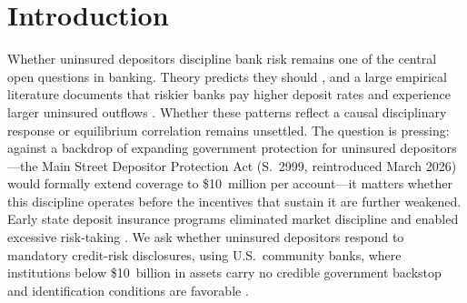 \section{Introduction}
\label{sec:intro}

Whether uninsured depositors discipline bank risk remains one of the
central open questions in banking.  Theory predicts they should
\citep{calomiris1991role, diamond2001liquidity}, and a large empirical
literature documents that riskier banks pay higher deposit rates and
experience larger uninsured outflows \citep{park1995market,
martinez2001depositors, maechler2006dynamic, iyer2016tale, egan2017deposit,
chen2024liquidity}.  Whether these patterns reflect a causal disciplinary
response or equilibrium correlation remains unsettled.  The question is
pressing: against a backdrop of expanding government protection for
uninsured depositors---the Main Street Depositor Protection Act (S.~2999,
reintroduced March 2026) would formally extend coverage to \$10~million
per account---it matters whether this discipline operates before the
incentives that sustain it are further weakened.  Early state deposit
insurance programs eliminated market discipline and enabled excessive
risk-taking \citep{calomiris2019stealing}.  We ask whether uninsured
depositors respond to mandatory credit-risk disclosures, using
U.S.\ community banks, where institutions below \$10~billion in assets
carry no credible government backstop and identification conditions are
favorable \citep{o1990deposit, flannery1996evidence}.

